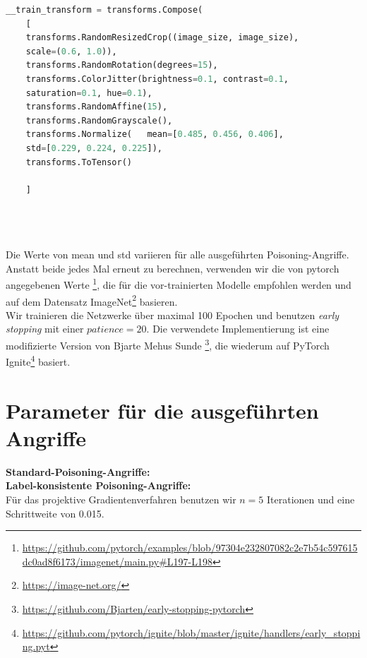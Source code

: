 \documentclass[11pt,a4paper]{article}
\numberwithin{equation}{section}
\begin{document}
	\begin{lstlisting}[language=Python, caption=Augmentierung beim Einlesen der Daten]
	__train_transform = transforms.Compose(
	[
	transforms.RandomResizedCrop((image_size, image_size), 
	scale=(0.6, 1.0)),
	transforms.RandomRotation(degrees=15),
	transforms.ColorJitter(brightness=0.1, contrast=0.1, 
	saturation=0.1, hue=0.1),
	transforms.RandomAffine(15),
	transforms.RandomGrayscale(),
	transforms.Normalize(	mean=[0.485, 0.456, 0.406], 
	std=[0.229, 0.224, 0.225]),
	transforms.ToTensor()
	
	]
	
	
	
	\end{lstlisting}
	Die Werte von mean und std variieren für alle ausgeführten Poisoning-Angriffe. Anstatt beide jedes Mal erneut zu berechnen, verwenden wir die von pytorch angegebenen Werte \footnote{\url{https://github.com/pytorch/examples/blob/97304e232807082c2e7b54c597615dc0ad8f6173/imagenet/main.py\#L197-L198}}, die für die vor-trainierten Modelle empfohlen werden und auf dem Datensatz ImageNet\footnote{\url{https://image-net.org/}} basieren.\\ 
	Wir trainieren die Netzwerke über maximal 100 Epochen und benutzen \textit{early stopping} mit einer $patience=20$. Die verwendete Implementierung ist eine modifizierte Version von Bjarte Mehus Sunde \footnote{\url{https://github.com/Bjarten/early-stopping-pytorch}}, die wiederum auf PyTorch Ignite\footnote{\url{https://github.com/pytorch/ignite/blob/master/ignite/handlers/early\_stopping.pyt}} basiert.\\
	
	
	
	\section{Parameter für die ausgeführten Angriffe}\label{param_attacks}
	
	\noindent \textbf{Standard-Poisoning-Angriffe:}\\
	
	
	\noindent \textbf{Label-konsistente Poisoning-Angriffe:}\\
	
	Für das projektive Gradientenverfahren benutzen wir $n=5$ Iterationen und eine Schrittweite von 0.015.\\
	
\end{document}
